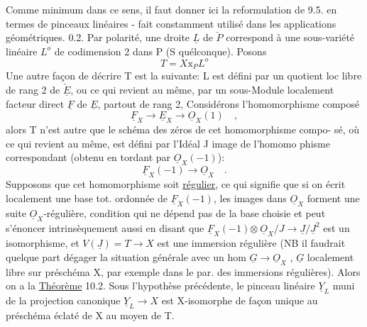 
Comme minimum dans ce sens, il faut  donner ici la reformulation de 9.5.
en termes de pinceaux linéaires  -  fait constamment utilisé dans les
applications géométriques.
0.2.  Par polarité, une droite $\underline{L}$  de $\check{P}$  correspond à une sous-variété
linéaire $L^{o}$ de codimension 2 dans P  (S quélconque).  Posons
\[ T = X\mathrm{x}_{P}L^{o} \]
Une autre façon  de décrire T est la suivante:  L  est défini par un
quotient loc libre de rang 2 de $\check{\underline{E}}$, ou ce qui revient au même, par un
sous-Module localement facteur direct  $\underline{F}$ de $\underline{E}$, partout de rang 2,
Considérons  l'homomorphisme composé
\[ \underline{F}_{X} \longrightarrow \underline{E}_{X} \longrightarrow \underline{O}_{X}(1) \quad , \]
alors  T n'est autre que  le schéma des zéros de cet homomorphisme compo-%
sé, où ce qui revient au même, est défini par l'Idéal J image de l'homomo%
phisme correspondant (obtenu en tordant par $\underline{O}_{X}(-1)$):
\[ \underline{F}_{X}(-1) \longrightarrow \underline{O}_{X} \quad . \]
Supposons
 que cet homomorphisme soit \uline{régulier}, ce qui signifie
que  si on écrit localement une base tot. ordonnée de $\underline{F}_{X}(-1)$,  les images dans $\underline{O}_{X}$\hand{\unsure{\^{}}}
forment une suite $\underline{O}_{X}$-régulière, condition qui ne dépend pas de la base
choisie et peut s'énoncer intrinsèquement aussi en disant que
$\underline{F}_{X}(-1)$$\otimes\ \underline{O}_{X}/J$$\to \underline{J}/\underline{J}^{2}$  est un isomorphisme, et  $V(\underline{J})=T \longrightarrow X$  est  une immersion
\placedmargin{|} régulière  (NB il  faudrait quelque part dégager la situation
\placedmargin{|} générale avec un hom  $\underline{G} \to \underline{O}_{X}$ , $\underline{G}$ localement libre sur préschéma X, par
\placedmargin{|} exemple dans le par. des immersions régulières).  Alors on a la
 \uline{Théorème}  10.2.   Sous l'hypothèse précédente, le pinceau
linéaire $\underline{Y}_{L}$  muni de la projection canonique $\underline{Y}_{L} \longrightarrow X$  est  X-isomorphe
de façon unique au préschéma éclaté  de X au moyen de T.

